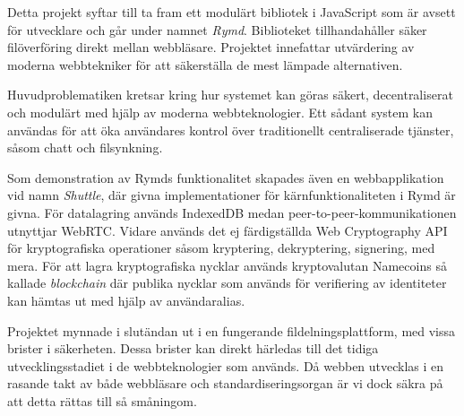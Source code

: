 Detta projekt syftar till ta fram ett modulärt bibliotek i JavaScript som är avsett för utvecklare och går under namnet \emph{Rymd}. Biblioteket tillhandahåller säker filöverföring direkt mellan webbläsare. Projektet innefattar utvärdering av moderna webbtekniker för att säkerställa de mest lämpade alternativen.

Huvudproblematiken kretsar kring hur systemet kan göras säkert, decentraliserat och modulärt med hjälp av moderna webbteknologier. Ett sådant system kan användas för att öka användares kontrol över traditionellt centraliserade tjänster, såsom chatt och filsynkning.

Som demonstration av Rymds funktionalitet skapades även en webbapplikation vid namn \emph{Shuttle}, där givna implementationer för kärnfunktionaliteten i Rymd är givna. För datalagring används IndexedDB medan peer-to-peer-kommunikationen utnyttjar WebRTC. Vidare används det ej färdigställda Web Cryptography API för kryptografiska operationer såsom kryptering, dekryptering, signering, med mera. För att lagra kryptografiska nycklar används kryptovalutan Namecoins så kallade \emph{blockchain} där publika nycklar som används för verifiering av identiteter kan hämtas ut med hjälp av användaralias.

Projektet mynnade i slutändan ut i en fungerande fildelningsplattform, med vissa brister i säkerheten. Dessa brister kan direkt härledas till det tidiga utvecklingsstadiet i de webbteknologier som används. Då webben utvecklas i en rasande takt av både webbläsare och standardiseringsorgan är vi dock säkra på att detta rättas till så småningom. 

